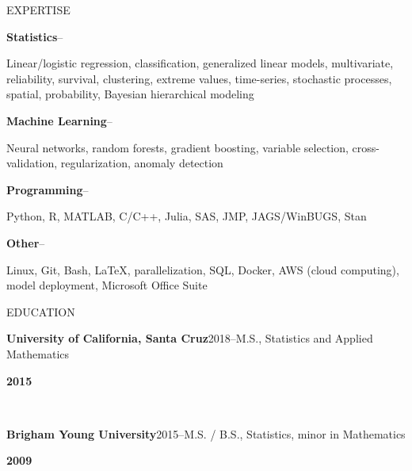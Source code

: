 \documentclass[12pt]{article}
\newcommand{\entry}[5]{
    \textbf{#1}\hfill #3--#4

    \textbf{#2}

    #5
    }
\begin{document}
\begin{minipage}[t]{0.2\textwidth}
    \begin{flushright}
        EXPERTISE \vert\ 
    \end{flushright}
\end{minipage}%
%
\begin{minipage}[t]{0.8\textwidth}
    \begin{flushleft}
        \entry{Statistics}{}{}{}{Linear/logistic regression, classification, generalized linear models, multivariate, reliability, survival, clustering, extreme values, time-series, stochastic processes, spatial, probability, Bayesian hierarchical modeling} \\
        \bigskip

        \entry{Machine Learning}{}{}{}{Neural networks, random forests, gradient boosting, variable selection, cross-validation, regularization, anomaly detection} \\
        \bigskip

        \entry{Programming}{}{}{}{Python, R, MATLAB, C/C++, Julia, SAS, JMP, JAGS/WinBUGS, Stan} \\
        \bigskip

        \entry{Other}{}{}{}{Linux, Git, Bash, LaTeX, parallelization, SQL, Docker, AWS (cloud computing), model deployment, Microsoft Office Suite} \\
    \end{flushleft}
\end{minipage}

\bigskip

\begin{minipage}[t]{0.2\textwidth}
    \begin{flushright}
        EDUCATION \vert\ 
    \end{flushright}
\end{minipage}%
%
\begin{minipage}[t]{0.8\textwidth}
    \begin{flushleft}
        \entry{University of California, Santa Cruz}{2015}{2018}{M.S., Statistics and Applied Mathematics} \\
        \bigskip

        \entry{Brigham Young University}{2009}{2015}{M.S. / B.S., Statistics, minor in Mathematics}
    \end{flushleft}
\end{minipage}
\end{document}
